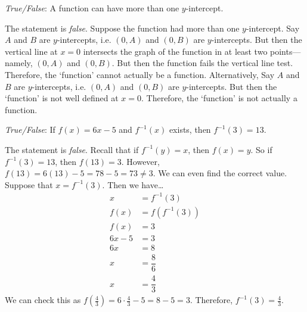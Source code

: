 \documentclass[11pt,letterpaper]{article}
\begin{document}
\quizsol \textit{True/False}: A function can have more than one $y$-intercept. \pspace

\sol The statement is \textit{false}. Suppose the function had more than one $y$-intercept. Say $A$ and $B$ are $y$-intercepts, i.e. $(0, A)$ and $(0, B)$ are $y$-intercepts. But then the vertical line at $x= 0$ intersects the graph of the function in at least two points---namely, $(0, A)$ and $(0, B)$. But then the function fails the vertical line test. Therefore, the `function' cannot actually be a function. Alternatively, Say $A$ and $B$ are $y$-intercepts, i.e. $(0, A)$ and $(0, B)$ are $y$-intercepts. But then the `function' is not well defined at $x= 0$. Therefore, the `function' is not actually a function. \pvspace{1.3cm}



\quizsol \textit{True/False}: If $f(x)= 6x - 5$ and $f^{-1}(x)$ exists, then $f^{-1}(3)= 13$. \pspace

\sol The statement is \textit{false}. Recall that if $f^{-1}(y)= x$, then $f(x)= y$. So if $f^{-1}(3)= 13$, then $f(13)= 3$. However, $f(13)= 6(13) - 5= 78 - 5= 73 \neq 3$. We can even find the correct value. Suppose that $x= f^{-1}(3)$. Then we have\dots
	\[
	\begin{aligned}
	x&= f^{-1}(3) \\
	f(x)&= f(f^{-1}(3)) \\
	f(x)&= 3 \\
	6x - 5&= 3 \\
	6x&= 8 \\
	x&= \dfrac{8}{6} \\
	x&= \dfrac{4}{3}
	\end{aligned}
	\]
We can check this as $f(\frac{4}{3})= 6 \cdot \frac{4}{3} - 5= 8 - 5= 3$. Therefore, $f^{-1}(3)= \frac{4}{3}$. 
\end{document}
